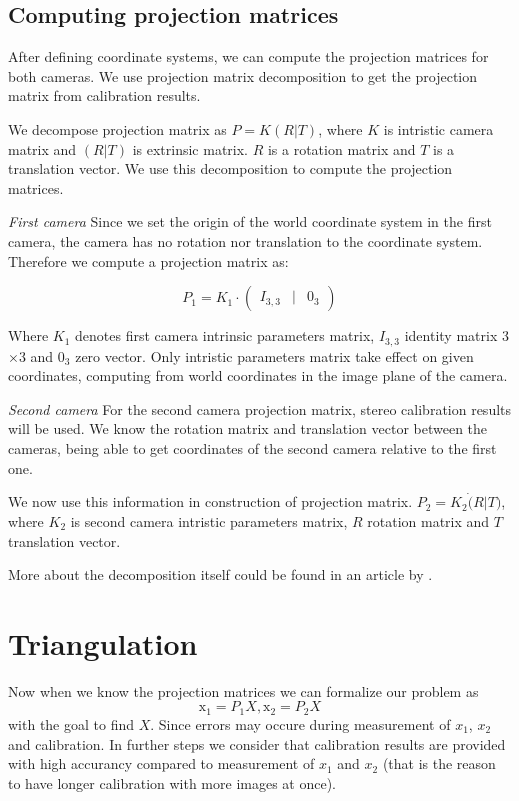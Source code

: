 \subsection{Computing projection matrices}
After defining coordinate systems, we can compute the projection matrices for
both cameras. We use projection matrix decomposition to get the projection matrix
from calibration results.

We decompose projection matrix as $P = K(R|T)$, where $K$ is intristic
camera matrix and $(R|T)$ is extrinsic matrix. $R$ is a rotation matrix and
$T$ is a translation vector. We use this decomposition to compute the projection
matrices.

\emph{First camera}
Since we set the origin of the world coordinate system in the first camera,
the camera has no rotation nor translation to the coordinate system. Therefore
we compute a projection matrix as:

\[
 P_1 = K_1 \cdot \begin{pmatrix}
	I_{3, 3} & | & 0_3  
\end{pmatrix}
\]

Where $K_1$ denotes first camera intrinsic parameters matrix, $I_{3,3}$ identity
matrix 3$\times$3 and $0_3$ zero vector. Only intristic parameters matrix take
effect on given coordinates, computing from world coordinates in the image plane of the camera.

\emph{Second camera}
For the second camera projection matrix, stereo calibration results will be
used. We know the rotation matrix and translation vector between the cameras,
being able to get coordinates of the second camera relative to the first one.

We now use this information in construction of projection matrix. $P_2 = K_2
\dot (R | T)$, where $K_2$ is second camera intristic parameters matrix, $R$
rotation matrix and $T$ translation vector.

More about the decomposition itself could be found in an article by
\citet{computervisionblog}.

\section{Triangulation}
Now when we know the projection matrices we can formalize our problem as
\begin{equation}
\mathrm{x_1} = P_1X, \mathrm{x_2} = P_2X \label{projection-statements}
\end{equation}
with the goal to find $X$. Since errors may occure during
measurement of $x_1$, $x_2$ and calibration. In further steps we consider that
calibration results are provided with high accurancy compared to measurement of
$x_1$ and $x_2$ (that is the reason to have longer calibration with more images
at once).

